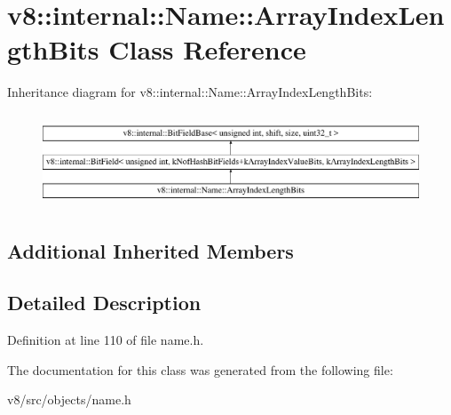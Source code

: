 \hypertarget{classv8_1_1internal_1_1Name_1_1ArrayIndexLengthBits}{}\section{v8\+:\+:internal\+:\+:Name\+:\+:Array\+Index\+Length\+Bits Class Reference}
\label{classv8_1_1internal_1_1Name_1_1ArrayIndexLengthBits}
Inheritance diagram for v8\+:\+:internal\+:\+:Name\+:\+:Array\+Index\+Length\+Bits\+:\begin{figure}[H]
\begin{center}
\leavevmode
\includegraphics[height=2.800000cm]{classv8_1_1internal_1_1Name_1_1ArrayIndexLengthBits}
\end{center}
\end{figure}
\subsection*{Additional Inherited Members}


\subsection{Detailed Description}


Definition at line 110 of file name.\+h.



The documentation for this class was generated from the following file\+:\begin{DoxyCompactItemize}
\item 
v8/src/objects/name.\+h\end{DoxyCompactItemize}
